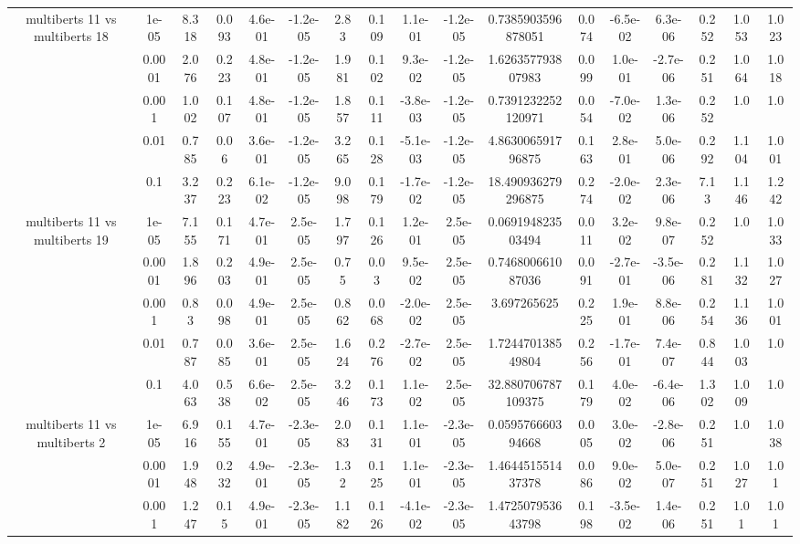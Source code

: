 \begin{tabular}{|c|c|c|c|c|c|c|c|c|c|c|c|c|c|c|c|c|}
\hline
\multirow{5}{*}{multiberts 11 vs multiberts 18} & 1e-05 & 8.318 & 0.093 & 4.6e-01 & -1.2e-05 & 2.83 & 0.109 & 1.1e-01 & -1.2e-05 & 0.7385903596878051 & 0.074 & -6.5e-02 & 6.3e-06 & 0.252 & 1.053 & 1.023 \\
 & 0.0001 & 2.076 & 0.223 & 4.8e-01 & -1.2e-05 & 1.981 & 0.102 & 9.3e-02 & -1.2e-05 & 1.626357793807983 & 0.099 & 1.0e-01 & -2.7e-06 & 0.251 & 1.064 & 1.018 \\
 & 0.001 & 1.002 & 0.107 & 4.8e-01 & -1.2e-05 & 1.857 & 0.111 & -3.8e-03 & -1.2e-05 & 0.7391232252120971 & 0.054 & -7.0e-02 & 1.3e-06 & 0.252 & 1.0 & 1.0 \\
 & 0.01 & 0.785 & 0.06 & 3.6e-01 & -1.2e-05 & 3.265 & 0.128 & -5.1e-03 & -1.2e-05 & 4.863006591796875 & 0.163 & 2.8e-01 & 5.0e-06 & 0.292 & 1.104 & 1.001 \\
 & 0.1 & 3.237 & 0.223 & 6.1e-02 & -1.2e-05 & 9.098 & 0.179 & -1.7e-02 & -1.2e-05 & 18.490936279296875 & 0.274 & -2.0e-02 & 2.3e-06 & 7.13 & 1.146 & 1.242 \\
\hline
\multirow{5}{*}{multiberts 11 vs multiberts 19} & 1e-05 & 7.155 & 0.171 & 4.7e-01 & 2.5e-05 & 1.797 & 0.126 & 1.2e-01 & 2.5e-05 & 0.069194823503494 & 0.011 & 3.2e-02 & 9.8e-07 & 0.252 & 1.0 & 1.033 \\
 & 0.0001 & 1.896 & 0.203 & 4.9e-01 & 2.5e-05 & 0.75 & 0.03 & 9.5e-02 & 2.5e-05 & 0.746800661087036 & 0.091 & -2.7e-01 & -3.5e-06 & 0.281 & 1.132 & 1.027 \\
 & 0.001 & 0.83 & 0.098 & 4.9e-01 & 2.5e-05 & 0.862 & 0.068 & -2.0e-02 & 2.5e-05 & 3.697265625 & 0.225 & 1.9e-01 & 8.8e-06 & 0.254 & 1.136 & 1.001 \\
 & 0.01 & 0.787 & 0.085 & 3.6e-01 & 2.5e-05 & 1.624 & 0.276 & -2.7e-02 & 2.5e-05 & 1.724470138549804 & 0.256 & -1.7e-01 & 7.4e-07 & 0.844 & 1.003 & 1.0 \\
 & 0.1 & 4.063 & 0.538 & 6.6e-02 & 2.5e-05 & 3.246 & 0.173 & 1.1e-02 & 2.5e-05 & 32.880706787109375 & 0.179 & 4.0e-02 & -6.4e-06 & 1.302 & 1.009 & 1.0 \\
\hline
\multirow{5}{*}{multiberts 11 vs multiberts 2} & 1e-05 & 6.916 & 0.155 & 4.7e-01 & -2.3e-05 & 2.083 & 0.131 & 1.1e-01 & -2.3e-05 & 0.059576660394668 & 0.005 & 3.0e-02 & -2.8e-06 & 0.251 & 1.0 & 1.038 \\
 & 0.0001 & 1.948 & 0.232 & 4.9e-01 & -2.3e-05 & 1.32 & 0.125 & 1.1e-01 & -2.3e-05 & 1.464451551437378 & 0.086 & 9.0e-02 & 5.0e-07 & 0.251 & 1.027 & 1.01 \\
 & 0.001 & 1.247 & 0.15 & 4.9e-01 & -2.3e-05 & 1.182 & 0.126 & -4.1e-02 & -2.3e-05 & 1.472507953643798 & 0.198 & -3.5e-02 & 1.4e-06 & 0.251 & 1.01 & 1.01 \\

\end{tabular}
